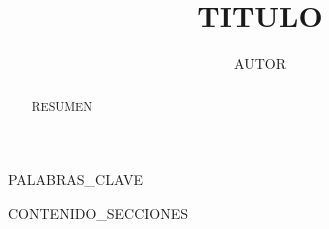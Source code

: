 \documentclass{IEEEoj}
\begin{document}

\title{{{TITULO}}}

\author{{{AUTOR}}}





\begin{abstract}
{{RESUMEN}}
\end{abstract}

\begin{IEEEkeywords}
{{PALABRAS_CLAVE}}
\end{IEEEkeywords}

\maketitle

{{CONTENIDO_SECCIONES}}
\end{document}
